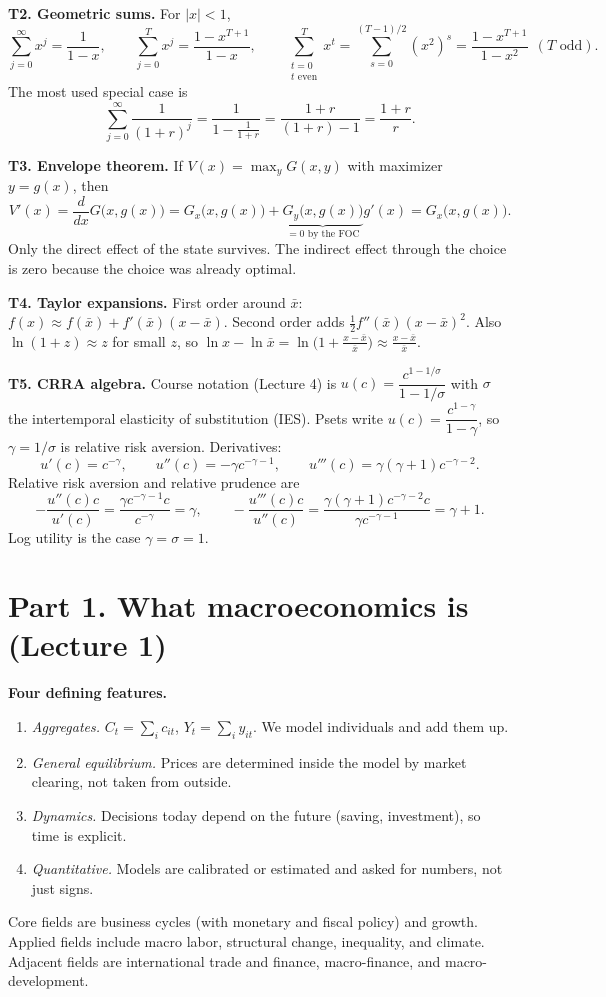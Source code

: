 \documentclass[12pt]{article}
\begin{document}
\textbf{T2. Geometric sums.} For $|x|<1$,
\[
\sum_{j=0}^{\infty}x^j=\frac{1}{1-x},\qquad
\sum_{j=0}^{T}x^j=\frac{1-x^{T+1}}{1-x},\qquad
\sum_{\substack{t=0\\t\text{ even}}}^{T}x^{t}=\sum_{s=0}^{(T-1)/2}(x^2)^s=\frac{1-x^{T+1}}{1-x^2}\ \ (T\text{ odd}).
\]
The most used special case is
\[
\sum_{j=0}^{\infty}\frac{1}{(1+r)^j}=\frac{1}{1-\frac{1}{1+r}}=\frac{1+r}{(1+r)-1}=\frac{1+r}{r}.
\]

\textbf{T3. Envelope theorem.} If $V(x)=\max_{y}G(x,y)$ with maximizer $y=g(x)$, then
\[
V'(x)=\frac{d}{dx}G\big(x,g(x)\big)=G_x\big(x,g(x)\big)+\underbrace{G_y\big(x,g(x)\big)}_{=0\text{ by the FOC}}g'(x)=G_x\big(x,g(x)\big).
\]
Only the direct effect of the state survives. The indirect effect through the
choice is zero because the choice was already optimal.

\textbf{T4. Taylor expansions.} First order around $\bar x$:
$f(x)\approx f(\bar x)+f'(\bar x)(x-\bar x)$. Second order adds
$\tfrac12f''(\bar x)(x-\bar x)^2$. Also $\ln(1+z)\approx z$ for small $z$, so
$\ln x-\ln\bar x=\ln\big(1+\tfrac{x-\bar x}{\bar x}\big)\approx\tfrac{x-\bar x}{\bar x}$.

\textbf{T5. CRRA algebra.} Course notation (Lecture 4) is
$u(c)=\dfrac{c^{1-1/\sigma}}{1-1/\sigma}$ with $\sigma$ the intertemporal
elasticity of substitution (IES). Psets write $u(c)=\dfrac{c^{1-\gamma}}{1-\gamma}$,
so $\gamma=1/\sigma$ is relative risk aversion. Derivatives:
\[
u'(c)=c^{-\gamma},\qquad u''(c)=-\gamma c^{-\gamma-1},\qquad u'''(c)=\gamma(\gamma+1)c^{-\gamma-2}.
\]
Relative risk aversion and relative prudence are
\[
-\frac{u''(c)c}{u'(c)}=\frac{\gamma c^{-\gamma-1}c}{c^{-\gamma}}=\gamma,\qquad
-\frac{u'''(c)c}{u''(c)}=\frac{\gamma(\gamma+1)c^{-\gamma-2}c}{\gamma c^{-\gamma-1}}=\gamma+1 .
\]
Log utility is the case $\gamma=\sigma=1$.

\section*{Part 1. What macroeconomics is (Lecture 1)}

\textbf{Four defining features.}
\begin{enumerate}
\item \emph{Aggregates.} $C_t=\sum_ic_{it}$, $Y_t=\sum_iy_{it}$. We model individuals and add them up.
\item \emph{General equilibrium.} Prices are determined inside the model by market clearing, not taken from outside.
\item \emph{Dynamics.} Decisions today depend on the future (saving, investment), so time is explicit.
\item \emph{Quantitative.} Models are calibrated or estimated and asked for numbers, not just signs.
\end{enumerate}
Core fields are business cycles (with monetary and fiscal policy) and growth.
Applied fields include macro labor, structural change, inequality, and climate.
Adjacent fields are international trade and finance, macro-finance, and
macro-development.
\end{document}
